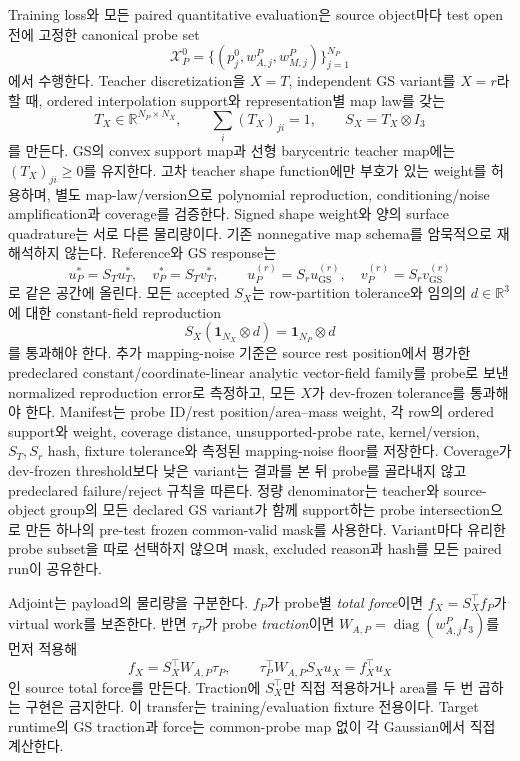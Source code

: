 \documentclass[11pt]{article}
\begin{document}
Training loss와 모든 paired quantitative evaluation은 source object마다 test open 전에 고정한
canonical probe set
\[
  \mathcal X_P^0=\{(p_j^0,w_{A,j}^P,w_{M,j}^P)\}_{j=1}^{N_P}
\]
에서 수행한다. Teacher discretization을 \(X=T\), independent GS variant를 \(X=r\)라 할 때,
ordered interpolation support와 representation별 map law를 갖는
\begin{equation}
  T_X\in\mathbb R^{N_P\times N_X},\qquad
  \sum_i(T_X)_{ji}=1,\qquad
  S_X=T_X\otimes I_3
  \label{eq:rd-common-probe-map}
\end{equation}
를 만든다. GS의 convex support map과 선형 barycentric teacher map에는
\((T_X)_{ji}\ge0\)를 유지한다. 고차 teacher shape function에만 부호가 있는 weight를 허용하며,
별도 map-law/version으로 polynomial reproduction, conditioning/noise amplification과 coverage를
검증한다. Signed shape weight와 양의 surface quadrature는 서로 다른 물리량이다.
기존 nonnegative map schema를 암묵적으로 재해석하지 않는다. Reference와 GS response는
\[
  u_P^*=S_Tu_T^*,\quad v_P^*=S_Tv_T^*,\qquad
  u_P^{(r)}=S_ru_{\mathrm{GS}}^{(r)},\quad
  v_P^{(r)}=S_rv_{\mathrm{GS}}^{(r)}
\]
로 같은 공간에 올린다. 모든 accepted \(S_X\)는 row-partition tolerance와 임의의
\(d\in\mathbb R^3\)에 대한 constant-field reproduction
\[
  S_X(\mathbf 1_{N_X}\otimes d)=\mathbf 1_{N_P}\otimes d
\]
를 통과해야 한다. 추가 mapping-noise 기준은 source rest position에서 평가한 predeclared
constant/coordinate-linear analytic vector-field family를 probe로 보낸 normalized reproduction error로
측정하고, 모든 \(X\)가 dev-frozen tolerance를 통과해야 한다. Manifest는 probe ID/rest position/area--mass weight, 각 row의 ordered
support와 weight, coverage distance, unsupported-probe rate, kernel/version, \(S_T,S_r\) hash,
fixture tolerance와 측정된 mapping-noise floor를 저장한다. Coverage가 dev-frozen threshold보다
낮은 variant는 결과를 본 뒤 probe를 골라내지 않고 predeclared failure/reject 규칙을 따른다.
정량 denominator는 teacher와 source-object group의 모든 declared GS variant가 함께 support하는
probe intersection으로 만든 하나의 pre-test frozen common-valid mask를 사용한다. Variant마다 유리한
probe subset을 따로 선택하지 않으며 mask, excluded reason과 hash를 모든 paired run이 공유한다.

Adjoint는 payload의 물리량을 구분한다. \(f_P\)가 probe별 \emph{total force}이면
\(f_X=S_X^\top f_P\)가 virtual work를 보존한다. 반면 \(\tau_P\)가 probe
\emph{traction}이면 \(W_{A,P}=\operatorname{diag}(w_{A,j}^PI_3)\)를 먼저 적용해
\begin{equation}
  f_X=S_X^\top W_{A,P}\tau_P,\qquad
  \tau_P^\top W_{A,P}S_Xu_X=f_X^\top u_X
  \label{eq:rd-common-probe-adjoint}
\end{equation}
인 source total force를 만든다. Traction에 \(S_X^\top\)만 직접 적용하거나 area를 두 번
곱하는 구현은 금지한다. 이 transfer는 training/evaluation fixture 전용이다. Target runtime의
GS traction과 force는 common-probe map 없이 각 Gaussian에서 직접 계산한다.
\end{document}
